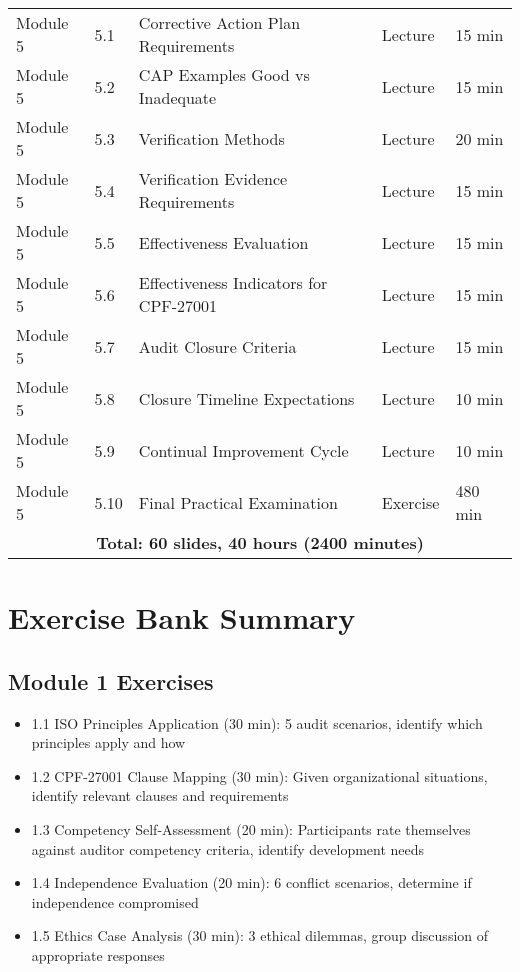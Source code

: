 \documentclass[11pt,a4paper]{article}
\begin{document}
\begin{longtable}{|p{2cm}|p{1cm}|p{7cm}|p{2cm}|p{1.5cm}|}
Module 5 & 5.1 & Corrective Action Plan Requirements & Lecture & 15 min \\
Module 5 & 5.2 & CAP Examples Good vs Inadequate & Lecture & 15 min \\
Module 5 & 5.3 & Verification Methods & Lecture & 20 min \\
Module 5 & 5.4 & Verification Evidence Requirements & Lecture & 15 min \\
Module 5 & 5.5 & Effectiveness Evaluation & Lecture & 15 min \\
Module 5 & 5.6 & Effectiveness Indicators for CPF-27001 & Lecture & 15 min \\
Module 5 & 5.7 & Audit Closure Criteria & Lecture & 15 min \\
Module 5 & 5.8 & Closure Timeline Expectations & Lecture & 10 min \\
Module 5 & 5.9 & Continual Improvement Cycle & Lecture & 10 min \\
Module 5 & 5.10 & Final Practical Examination & Exercise & 480 min \\
\hline

\multicolumn{5}{|c|}{\textbf{Total: 60 slides, 40 hours (2400 minutes)}} \\
\hline

\end{longtable}

\section{Exercise Bank Summary}

\subsection{Module 1 Exercises}
\begin{itemize}
\item 1.1 ISO Principles Application (30 min): 5 audit scenarios, identify which principles apply and how
\item 1.2 CPF-27001 Clause Mapping (30 min): Given organizational situations, identify relevant clauses and requirements
\item 1.3 Competency Self-Assessment (20 min): Participants rate themselves against auditor competency criteria, identify development needs
\item 1.4 Independence Evaluation (20 min): 6 conflict scenarios, determine if independence compromised
\item 1.5 Ethics Case Analysis (30 min): 3 ethical dilemmas, group discussion of appropriate responses
\end{itemize}
\end{document}
